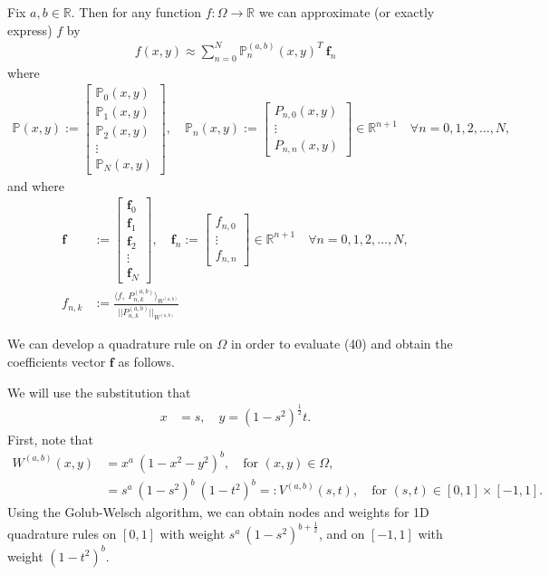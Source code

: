\documentclass[11pt, oneside]{article}   	%
\newcommand{\half}{\frac{1}{2}}
\newcommand{\R}{\mathbb{R}}
\newcommand{\bigP}{\mathbb{P}}
\newcommand{\Pnk}{P_{n,k}}
\begin{document}
Fix \(a,b \in \R\). Then for any function \(f : \Omega \to \R\) we can approximate (or exactly express) \(f\) by
\begin{align}
f(x,y) \approx \sum_{n=0}^N \bigP_n^{(a,b)}(x,y)^T \: \mathbf{f}_n
\end{align}
where
\begin{align}
\bigP(x,y) := \begin{bmatrix}
		\bigP_0(x,y) \\
		\hline
		\bigP_1(x,y) \\
		\hline
		\bigP_2(x,y) \\
		\hline
		\vdots \\
		\hline
		\bigP_N(x,y)
	\end{bmatrix},
\quad
\bigP_n(x,y) := \begin{bmatrix}
		P_{n,0}(x,y) \\
		\vdots \\
		P_{n,n}(x,y)
	\end{bmatrix} \in \R^{n+1} \quad \forall n = 0,1,2,\dots,N,
\end{align}
and where
\begin{align}
\mathbf{f} &:= \begin{bmatrix}
		\mathbf{f}_0 \\
		\hline
		\mathbf{f}_1 \\
		\hline
		\mathbf{f}_2\\
		\hline
		\vdots \\
		\hline
		\mathbf{f}_N
	\end{bmatrix},
\quad
\mathbf{f}_n := \begin{bmatrix}
		f_{n,0} \\
		\vdots \\
		f_{n,n}
	\end{bmatrix} \in \R^{n+1} \quad \forall n = 0,1,2,\dots,N, \\
f_{n,k} &:= \frac{\langle f, \: \Pnk^{(a,b)} \rangle_{W^{(a,b)}}}{|| \Pnk^{(a,b)} ||_{W^{(a,b)}}}
\end{align}




We can develop a quadrature rule on \(\Omega\) in order to evaluate (40) and obtain the coefficients vector \(\mathbf{f}\) as follows. 

We will use the substitution that
\begin{align}
x &= s, \quad y = (1-s^2)^\half t.
\end{align}
First, note that
\begin{align}
W^{(a,b)}(x,y) &= x^a \: (1-x^2-y^2)^b, \quad \text{for } (x,y) \in \Omega, \\
		      &= s^a \: (1-s^2)^{b} \: (1-t^2)^b =: V^{(a,b)}(s,t), \quad \text{for } (s,t) \in [0,1] \times [-1,1].
\end{align}
Using the Golub-Welsch algorithm, we can obtain nodes and weights for 1D quadrature rules on \([0,1]\) with weight \(s^a \: (1-s^2)^{b+\half}\), and on \([-1,1]\) with weight \((1-t^2)^b\).
\end{document}
